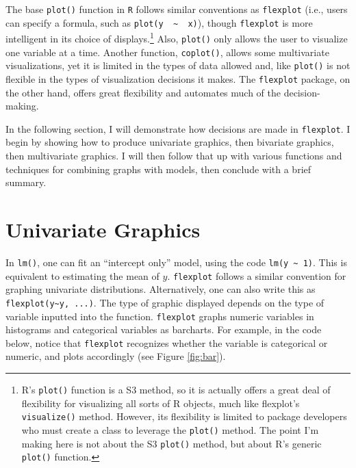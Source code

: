\documentclass[
  english,
  man]{apa6}
\begin{document}
The base \texttt{plot()} function in \texttt{R} follows similar conventions as \texttt{flexplot} (i.e., users can specify a formula, such as \texttt{plot(y\ \ \textasciitilde{}\ \ x)}), though \texttt{flexplot} is more intelligent in its choice of displays.\footnote{R's \texttt{plot()} function is a S3 method, so it is actually offers a great deal of flexibility for visualizing all sorts of R objects, much like flexplot's \texttt{visualize()} method. However, its flexibility is limited to package developers who must create a class to leverage the \texttt{plot()} method. The point I'm making here is not about the S3 \texttt{plot()} method, but about R's generic \texttt{plot()} function.} Also, \texttt{plot()} only allows the user to visualize one variable at a time. Another function, \texttt{coplot()}, allows some multivariate visualizations, yet it is limited in the types of data allowed and, like \texttt{plot()} is not flexible in the types of visualization decisions it makes. The \texttt{flexplot} package, on the other hand, offers great flexibility and automates much of the decision-making.

In the following section, I will demonstrate how decisions are made in \texttt{flexplot}. I begin by showing how to produce univariate graphics, then bivariate graphics, then multivariate graphics. I will then follow that up with various functions and techniques for combining graphs with models, then conclude with a brief summary.

\hypertarget{univariate-graphics}{%
\section{Univariate Graphics}\label{univariate-graphics}}

In \texttt{lm()}, one can fit an ``intercept only'' model, using the code \texttt{lm(y\ \textasciitilde{}\ 1)}. This is equivalent to estimating the mean of \(y\). \texttt{flexplot} follows a similar convention for graphing univariate distributions. Alternatively, one can also write this as \texttt{flexplot(y\textasciitilde{}y,\ ...)}. The type of graphic displayed depends on the type of variable inputted into the function. \texttt{flexplot} graphs numeric variables in histograms and categorical variables as barcharts. For example, in the code below, notice that \texttt{flexplot} recognizes whether the variable is categorical or numeric, and plots accordingly (see Figure \ref{fig:bar}).

\small
\end{document}
